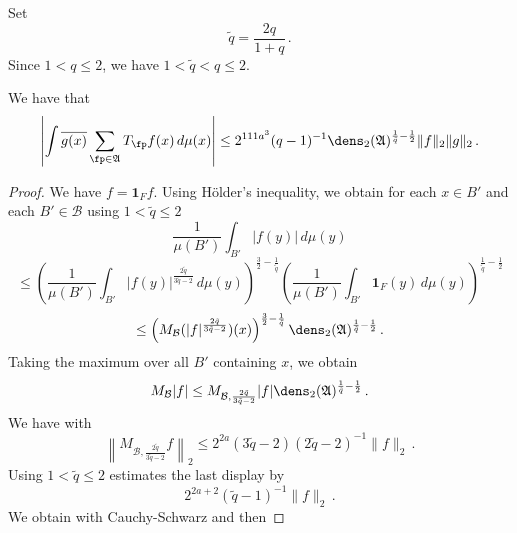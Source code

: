 Set
\begin{equation}
    \tilde{q}=\frac {2q}{1+q}\,.
\end{equation}
Since $1< q\le 2$, we have $1<\tilde{q}<q\le 2$.
\begin{lemma}
\label{dens2-antichain}
\leanok
We have that
\begin{equation}\label{eqttt9}
  \left|\int \overline{g(x)} \sum_{\fp \in \mathfrak{A}} T_{\fp} f(x)\, d\mu(x)\right|\le
  2^{111a^3}({q}-1)^{-1} \dens_2(\mathfrak{A})^{\frac 1{\tilde{q}}-\frac 12} \|f\|_2\|g\|_2\, .
\end{equation}
\end{lemma}
\begin{proof}
We have $f=\mathbf{1}_Ff$. Using H\"older's inequality, we obtain for
each $x\in B'$ and each $B'\in \mathcal{B}$ using $1<\tilde{q}\le 2$
\begin{equation}
    \frac 1{\mu(B')}\int_{B'} |f(y)|\, d\mu(y)
\end{equation}
\begin{equation}
    \le
    \left(\frac 1{\mu(B')}\int_{B'} |f(y)|^{\frac {2{\tilde{q}}}{3\tilde{q}-2}}\, d\mu(y)\right)^{\frac 32-\frac 1{\tilde{q}}}
    \left(\frac 1{\mu(B')}\int_{B'} \mathbf{1}_F(y)\, d\mu(y)\right)^{\frac 1{\tilde{q}}-\frac 12}
\end{equation}
\begin{equation}
    \le \left(M_{\mathcal{B}} (|f|^{\frac {2{\tilde{q}}}{3{\tilde{q}}-2}})(x)\right)^{\frac 32-\frac 1{\tilde{q}}}
\dens_2(\mathfrak{A})^{\frac 1{\tilde{q}}-\frac 12}\, .
\end{equation}
Taking the maximum over all $B'$ containing $x$, we obtain
\begin{equation} \label{eqttt1}
    M_{\mathcal{B}}|f|\le
    M_{\mathcal{B},\frac {2{\tilde{q}}}{3{\tilde{q}}-2} } |f|
    \dens_2(\mathfrak{A})^{\frac 1{\tilde{q}}-\frac 12}\, .
\end{equation}
We have with 
\begin{equation}
\left\|M_{\mathcal{B}, \frac {2{\tilde{q}}}{3{\tilde{q}}-2}} f\right\|_2\le 2^{2a}(3\tilde{q}-2)(2\tilde{q}-2)^{-1}\|f\|_2\, .
\end{equation}
Using $1<\tilde{q}\le 2$ estimates the last display by
\begin{equation}\label{eqttt2}
 2^{2a+2} (\tilde{q}-1)^{-1} \|f\|_2\, .
\end{equation}
We obtain with Cauchy-Schwarz
and then 

\end{proof}
